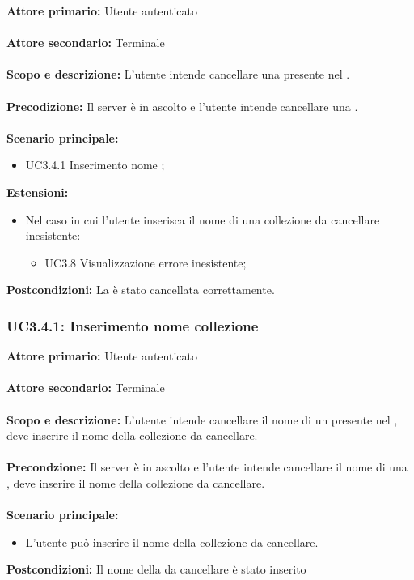 \documentclass{scalatekids-article}
\begin{document}
\textbf{Attore primario:} Utente autenticato\\ \\
\textbf{Attore secondario:} Terminale\\ \\
\textbf{Scopo e descrizione:} L’utente intende cancellare una  presente nel .\\ \\
\textbf{Precodizione:} Il server è in ascolto e l’utente intende cancellare una .\\ \\
\textbf{Scenario principale:}
\begin{itemize}
\item UC3.4.1 Inserimento nome ;
\end{itemize}
\textbf{Estensioni:}
\begin{itemize}
\item Nel caso in cui l'utente inserisca il nome di una collezione da cancellare inesistente:
  \begin{itemize}
  \item UC3.8 Visualizzazione errore  inesistente;
  \end{itemize}
\end{itemize}
\textbf{Postcondizioni:} La  è stato cancellata correttamente.

\subsubsection{UC3.4.1: Inserimento nome collezione}

\textbf{Attore primario:} Utente autenticato\\ \\
\textbf{Attore secondario:} Terminale\\ \\
\textbf{Scopo e descrizione:} L'utente intende cancellare il nome di un  presente nel , deve inserire il nome della collezione da cancellare.\\ \\
\textbf{Precondzione:} Il server è in ascolto e l'utente intende cancellare il nome di una , deve inserire il nome della collezione da cancellare.\\ \\
\textbf{Scenario principale:}
\begin{itemize}
\item L'utente può inserire il nome della collezione da cancellare.
\end{itemize}
\textbf{Postcondizioni:} Il nome della  da cancellare è stato inserito
\end{document}
